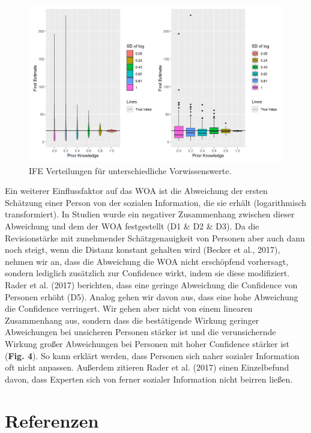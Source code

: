 \documentclass[
  man,floatsintext]{apa6}
\begin{document}
\begin{figure}
\centering
\includegraphics{Abbildungen/Plot_PK_FE.png}
\caption{\label{fig:my-figure3}IFE Verteilungen für unterschiedliche Vorwissenswerte.}
\end{figure}

Ein weiterer Einflussfaktor auf das WOA ist die Abweichung der ersten Schätzung einer Person von der sozialen Information, die sie erhält (logarithmisch transformiert). In Studien wurde ein negativer Zusammenhang zwischen dieser Abweichung und dem der WOA festgestellt (D1 \& D2 \& D3). Da die Revisionstärke mit zunehmender Schätzgenauigkeit von Personen aber auch dann noch steigt, wenn die Distanz konstant gehalten wird (Becker et al., 2017), nehmen wir an, dass die Abweichung die WOA nicht erschöpfend vorhersagt, sondern lediglich zusätzlich zur Confidence wirkt, indem sie diese modifiziert. Rader et al. (2017) berichten, dass eine geringe Abweichung die Confidence von Personen erhöht (D5). Analog gehen wir davon aus, dass eine hohe Abweichung die Confidence verringert. Wir gehen aber nicht von einem linearen Zusammenhang aus, sondern dass die bestätigende Wirkung geringer Abweichungen bei unsicheren Personen stärker ist und die verunsichernde Wirkung großer Abweichungen bei Personen mit hoher Confidence stärker ist (\textbf{Fig. 4}). So kann erklärt werden, dass Personen sich naher sozialer Information oft nicht anpassen. Außerdem zitieren Rader et al. (2017) einen Einzelbefund davon, dass Experten sich von ferner sozialer Information nicht beirren ließen.

\newpage

\section{Referenzen}\label{referenzen}
\end{document}

